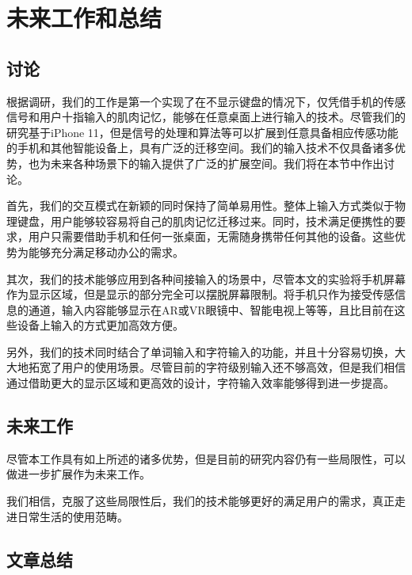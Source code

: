 \chapter{未来工作和总结}
\label{cha:conclusion}
\section{讨论}
根据调研，我们的工作是第一个实现了在不显示键盘的情况下，仅凭借手机的传感信号和用户十指输入的肌肉记忆，能够在任意桌面上进行输入的技术。尽管我们的研究基于iPhone 11，但是信号的处理和算法等可以扩展到任意具备相应传感功能的手机和其他智能设备上，具有广泛的迁移空间。我们的输入技术不仅具备诸多优势，也为未来各种场景下的输入提供了广泛的扩展空间。我们将在本节中作出讨论。

首先，我们的交互模式在新颖的同时保持了简单易用性。整体上输入方式类似于物理键盘，用户能够较容易将自己的肌肉记忆迁移过来。同时，技术满足便携性的要求，用户只需要借助手机和任何一张桌面，无需随身携带任何其他的设备。这些优势为能够充分满足移动办公的需求。

其次，我们的技术能够应用到各种间接输入的场景中，尽管本文的实验将手机屏幕作为显示区域，但是显示的部分完全可以摆脱屏幕限制。将手机只作为接受传感信息的通道，输入内容能够显示在AR或VR眼镜中、智能电视上等等，且比目前在这些设备上输入的方式更加高效方便。

另外，我们的技术同时结合了单词输入和字符输入的功能，并且十分容易切换，大大地拓宽了用户的使用场景。尽管目前的字符级别输入还不够高效，但是我们相信通过借助更大的显示区域和更高效的设计，字符输入效率能够得到进一步提高。

\section{未来工作} %
尽管本工作具有如上所述的诸多优势，但是目前的研究内容仍有一些局限性，可以做进一步扩展作为未来工作。

我们相信，克服了这些局限性后，我们的技术能够更好的满足用户的需求，真正走进日常生活的使用范畴。

\section{文章总结}

